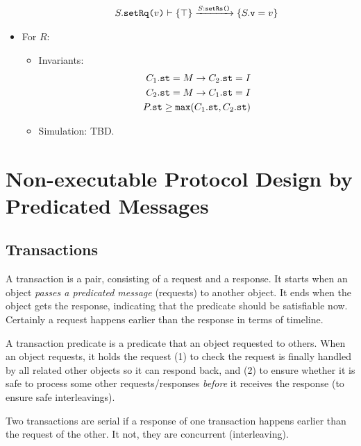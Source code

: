 \documentclass[format=manuscript]{acmart}
\begin{document}
\begin{itemize}
\begin{enumerate}
\begin{eqnarray}
      S.\texttt{setRq(}v\texttt{)}\vdash \{ \top \} \xrightarrow{S:\texttt{setRs()}} \{ S.\texttt{v} = v \} \label{trs4}
    \end{eqnarray}
  \end{enumerate}
\item For $R$:
  \begin{itemize}
  \item Invariants:
    \begin{align}
      C_1.\texttt{st} = M \to C_2.\texttt{st} = I \label{inv1} \\
      C_2.\texttt{st} = M \to C_1.\texttt{st} = I \label{inv2} \\
      P.\texttt{st} \geq \texttt{max}(C_1.\texttt{st}, C_2.\texttt{st}) \label{inv3}
    \end{align}
  \item Simulation: TBD.
  \end{itemize}
\end{itemize}

\section{Non-executable Protocol Design by Predicated Messages}

\subsection{Transactions}

\begin{definition}[Transaction]
  A transaction is a pair, consisting of a request and a response. It starts
  when an object \emph{passes a predicated message} (requests) to another
  object. It ends when the object gets the response, indicating that the
  predicate should be satisfiable now. Certainly a request happens earlier than
  the response in terms of timeline.
\end{definition}

\begin{definition}
  A transaction predicate is a predicate that an object requested to
  others. When an object requests, it holds the request (1) to check the request
  is finally handled by all related other objects so it can respond back, and
  (2) to ensure whether it is safe to process some other requests/responses
  \emph{before} it receives the response (to ensure safe interleavings).
\end{definition}

\begin{definition}
  Two transactions are serial if a response of one transaction happens earlier
  than the request of the other. It not, they are concurrent (interleaving).
\end{definition}
\end{document}
